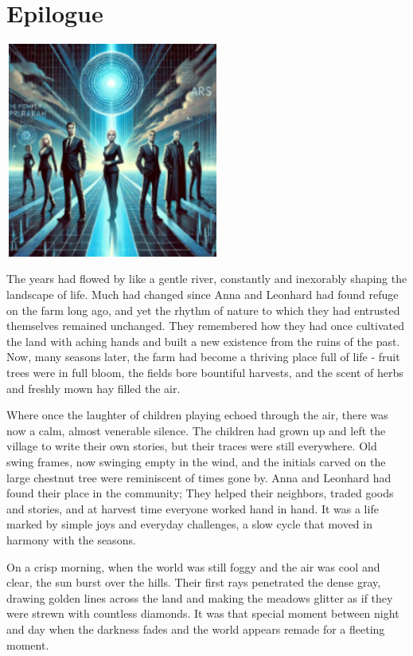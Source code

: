 \documentclass[
]{article}
\begin{document}
\section{Epilogue}\label{epilogue}

\includegraphics[width=2.78439in,height=2.7785in]{media/image0008.png}

The years had flowed by like a gentle river, constantly and inexorably
shaping the landscape of life. Much had changed since Anna and Leonhard
had found refuge on the farm long ago, and yet the rhythm of nature to
which they had entrusted themselves remained unchanged. They remembered
how they had once cultivated the land with aching hands and built a new
existence from the ruins of the past. Now, many seasons later, the farm
had become a thriving place full of life - fruit trees were in full
bloom, the fields bore bountiful harvests, and the scent of herbs and
freshly mown hay filled the air.

Where once the laughter of children playing echoed through the air,
there was now a calm, almost venerable silence. The children had grown
up and left the village to write their own stories, but their traces
were still everywhere. Old swing frames, now swinging empty in the wind,
and the initials carved on the large chestnut tree were reminiscent of
times gone by. Anna and Leonhard had found their place in the community;
They helped their neighbors, traded goods and stories, and at harvest
time everyone worked hand in hand. It was a life marked by simple joys
and everyday challenges, a slow cycle that moved in harmony with the
seasons.

On a crisp morning, when the world was still foggy and the air was cool
and clear, the sun burst over the hills. Their first rays penetrated the
dense gray, drawing golden lines across the land and making the meadows
glitter as if they were strewn with countless diamonds. It was that
special moment between night and day when the darkness fades and the
world appears remade for a fleeting moment.
\end{document}
